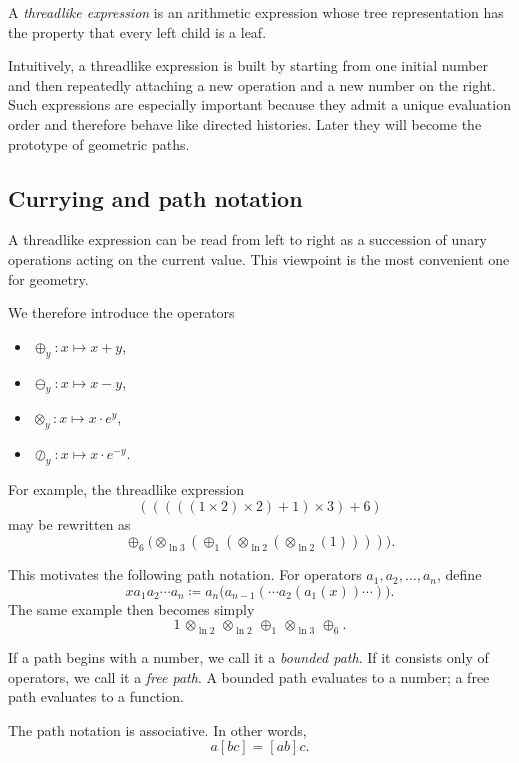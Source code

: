 \begin{definition}
A \emph{threadlike expression} is an arithmetic expression whose tree representation has the property that every left child is a leaf.
\end{definition}

Intuitively, a threadlike expression is built by starting from one initial number and then repeatedly attaching a new operation and a new number on the right. Such expressions are especially important because they admit a unique evaluation order and therefore behave like directed histories. Later they will become the prototype of geometric paths.

\subsection{Currying and path notation}\label{subsec:currying}

A threadlike expression can be read from left to right as a succession of unary operations acting on the current value. This viewpoint is the most convenient one for geometry.

We therefore introduce the operators
\begin{itemize}
    \item $\oplus_y : x \mapsto x+y$,
    \item $\ominus_y : x \mapsto x-y$,
    \item $\otimes_y : x \mapsto x\cdot e^y$,
    \item $\oslash_y : x \mapsto x\cdot e^{-y}$.
\end{itemize}

For example, the threadlike expression
\[
(((((1 \times 2) \times 2) + 1) \times 3) + 6)
\]
may be rewritten as
\[
\oplus_6\bigl(\otimes_{\ln 3}(\oplus_1(\otimes_{\ln 2}(\otimes_{\ln 2}(1))))\bigr).
\]

This motivates the following path notation. For operators $a_1, a_2, \dots, a_n$, define
\[
x a_1 a_2 \cdots a_n \coloneqq a_n\bigl(a_{n-1}(\cdots a_2(a_1(x))\cdots)\bigr).
\]
The same example then becomes simply
\[
1\,\otimes_{\ln 2}\,\otimes_{\ln 2}\,\oplus_1\,\otimes_{\ln 3}\,\oplus_6.
\]

If a path begins with a number, we call it a \emph{bounded path}. If it consists only of operators, we call it a \emph{free path}. A bounded path evaluates to a number; a free path evaluates to a function.

\begin{lemma}\label{lemma:associative}
The path notation is associative. In other words,
\[
a[bc]=[ab]c.
\]
\end{lemma}

